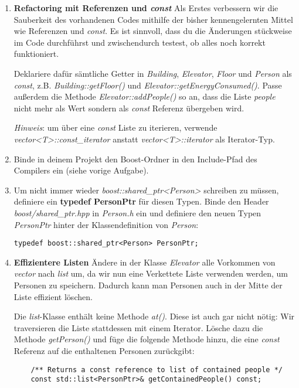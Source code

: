 \begin{enumerate}
\item \textbf{Refactoring mit Referenzen und \emph{const}}
Als Erstes verbessern wir die Sauberkeit des vorhandenen Codes mithilfe der bisher kennengelernten Mittel wie Referenzen und \emph{const}.
Es ist sinnvoll, dass du die Änderungen stückweise im Code durchführst und zwischendurch testest, ob alles noch korrekt funktioniert.

Deklariere dafür sämtliche Getter in \emph{Building}, \emph{Elevator}, \emph{Floor} und \emph{Person} als \emph{const}, z.B. \emph{Building::getFloor()} und \emph{Elevator::getEnergyConsumed()}.
Passe außerdem die Methode \emph{Elevator::addPeople()} so an, dass die Liste \emph{people} nicht mehr als Wert sondern als \emph{const} Referenz übergeben wird.

\emph{Hinweis}: um über eine \emph{const} Liste zu iterieren, verwende \emph{vector<T>::const\_iterator} anstatt \emph{vector<T>::iterator} als Iterator-Typ.

\item
Binde in deinem Projekt den Boost-Ordner in den Include-Pfad des Compilers ein (siehe vorige Aufgabe).

\item Um nicht immer wieder \emph{boost::shared\_ptr<Person>} schreiben zu müssen, definiere ein \textbf{typedef PersonPtr} für diesen Typen.
Binde den Header \emph{boost/shared\_ptr.hpp} in \emph{Person.h} ein und definiere den neuen Typen \emph{PersonPtr} hinter der Klassendefinition von \emph{Person}:

\begin{lstlisting}
typedef boost::shared_ptr<Person> PersonPtr;
\end{lstlisting}

\item \textbf{Effizientere Listen}
Ändere in der Klasse \emph{Elevator} alle Vorkommen von \emph{vector} nach \emph{list} um, da wir nun eine Verkettete Liste verwenden werden, um Personen zu speichern.
Dadurch kann man Personen auch in der Mitte der Liste effizient löschen.

Die \emph{list}-Klasse enthält keine Methode \emph{at()}.
Diese ist auch gar nicht nötig:
Wir traversieren die Liste stattdessen mit einem Iterator. 
Lösche dazu die Methode \emph{getPerson()} und füge die folgende Methode hinzu, die eine \emph{const} Referenz auf die enthaltenen Personen zurückgibt:

\begin{lstlisting}
	/** Returns a const reference to list of contained people */
	const std::list<PersonPtr>& getContainedPeople() const;
\end{lstlisting}


\end{enumerate}
